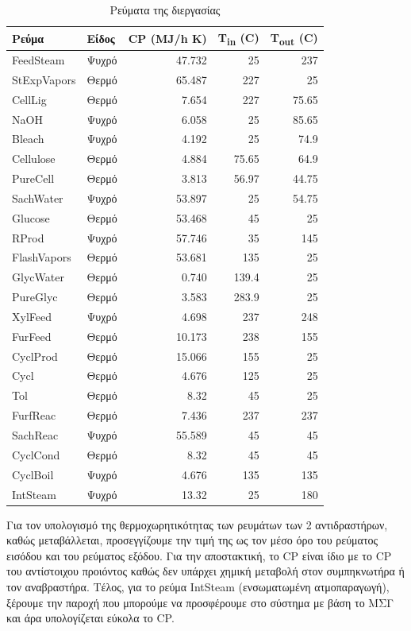 \documentclass[11pt]{article}
\begin{document}
\begin{table}[htbp]
\caption{Ρεύματα της διεργασίας}
\centering
\begin{tabular}{llrrr}
Ρεύμα & Είδος & CP (MJ/h K) & Τ\textsubscript{in} (C) & T\textsubscript{out} (C)\\
\hline
FeedSteam & Ψυχρό & 47.732 & 25 & 237\\
StExpVapors & Θερμό & 65.487 & 227 & 25\\
CellLig & Θερμό & 7.654 & 227 & 75.65\\
NaOH & Ψυχρό & 6.058 & 25 & 85.65\\
Bleach & Ψυχρό & 4.192 & 25 & 74.9\\
Cellulose & Θερμό & 4.884 & 75.65 & 64.9\\
PureCell & Θερμό & 3.813 & 56.97 & 44.75\\
SachWater & Ψυχρό & 53.897 & 25 & 54.75\\
Glucose & Θερμό & 53.468 & 45 & 25\\
RProd & Ψυχρό & 57.746 & 35 & 145\\
FlashVapors & Θερμό & 53.681 & 135 & 25\\
GlycWater & Θερμό & 0.740 & 139.4 & 25\\
PureGlyc & Θερμό & 3.583 & 283.9 & 25\\
XylFeed & Ψυχρό & 4.698 & 237 & 248\\
FurFeed & Θερμό & 10.173 & 238 & 155\\
CyclProd & Θερμό & 15.066 & 155 & 25\\
Cycl & Θερμό & 4.676 & 125 & 25\\
Tol & Θερμό & 8.32 & 45 & 25\\
FurfReac & Θερμό & 7.436 & 237 & 237\\
SachReac & Ψυχρό & 55.589 & 45 & 45\\
CyclCond & Θερμό & 8.32 & 45 & 45\\
CyclBoil & Ψυχρό & 4.676 & 135 & 135\\
IntSteam & Ψυχρό & 13.32 & 25 & 180\\
\end{tabular}
\end{table}

Για τον υπολογισμό της θερμοχωρητικότητας των ρευμάτων των 2 αντιδραστήρων, καθώς μεταβάλλεται, προσεγγίζουμε την τιμή της ως τον μέσο όρο του ρεύματος εισόδου και του ρεύματος εξόδου. Για την αποστακτική, το CP είναι ίδιο με το CP του αντίστοιχου προιόντος καθώς δεν υπάρχει χημική μεταβολή στον συμπηκνωτήρα ή τον αναβραστήρα. Τέλος, για το ρεύμα IntSteam (ενσωματωμένη ατμοπαραγωγή), ξέρουμε την παροχή που μπορούμε να προσφέρουμε στο σύστημα με βάση το ΜΣΓ και άρα υπολογίζεται εύκολα το CP.
\end{document}
